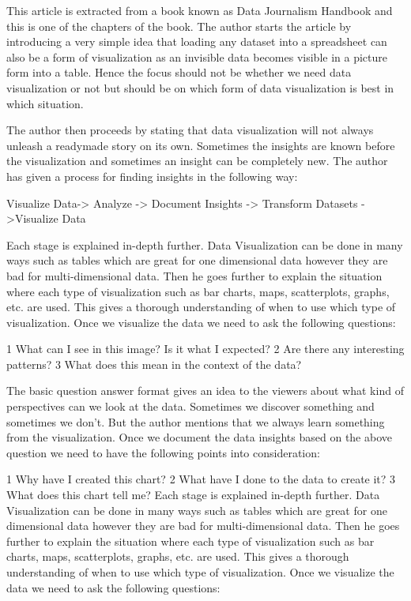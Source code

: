 \documentclass[]{book}
\theoremstyle{definition}
\theoremstyle{definition}
\theoremstyle{definition}
\theoremstyle{remark}
\begin{document}
This article is extracted from a book known as Data Journalism Handbook
and this is one of the chapters of the book. The author starts the
article by introducing a very simple idea that loading any dataset into
a spreadsheet can also be a form of visualization as an invisible data
becomes visible in a picture form into a table. Hence the focus should
not be whether we need data visualization or not but should be on which
form of data visualization is best in which situation.

The author then proceeds by stating that data visualization will not
always unleash a readymade story on its own. Sometimes the insights are
known before the visualization and sometimes an insight can be
completely new. The author has given a process for finding insights in
the following way:

Visualize Data-\textgreater{} Analyze -\textgreater{} Document Insights
-\textgreater{} Transform Datasets -\textgreater{}Visualize Data

Each stage is explained in-depth further. Data Visualization can be done
in many ways such as tables which are great for one dimensional data
however they are bad for multi-dimensional data. Then he goes further to
explain the situation where each type of visualization such as bar
charts, maps, scatterplots, graphs, etc. are used. This gives a thorough
understanding of when to use which type of visualization. Once we
visualize the data we need to ask the following questions:

1 What can I see in this image? Is it what I expected? 2 Are there any
interesting patterns? 3 What does this mean in the context of the data?

The basic question answer format gives an idea to the viewers about what
kind of perspectives can we look at the data. Sometimes we discover
something and sometimes we don't. But the author mentions that we always
learn something from the visualization. Once we document the data
insights based on the above question we need to have the following
points into consideration:

1 Why have I created this chart? 2 What have I done to the data to
create it? 3 What does this chart tell me? Each stage is explained
in-depth further. Data Visualization can be done in many ways such as
tables which are great for one dimensional data however they are bad for
multi-dimensional data. Then he goes further to explain the situation
where each type of visualization such as bar charts, maps, scatterplots,
graphs, etc. are used. This gives a thorough understanding of when to
use which type of visualization. Once we visualize the data we need to
ask the following questions:
\end{document}
